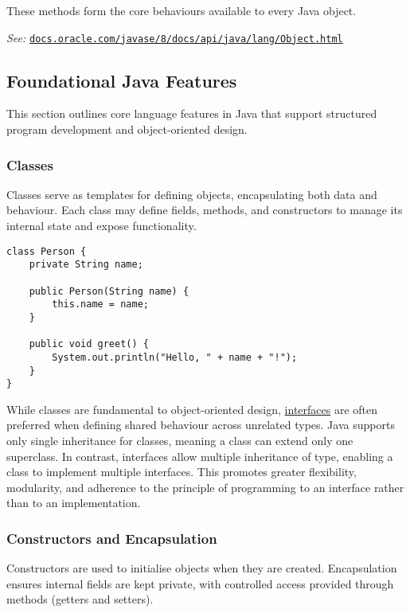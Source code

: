 \documentclass{article}
\begin{document}
These methods form the core behaviours available to every Java object.

\smallskip
\textit{See:} \href{https://docs.oracle.com/javase/8/docs/api/java/lang/Object.html}{\texttt{docs.oracle.com/javase/8/docs/api/java/lang/Object.html}}

\subsection{Foundational Java Features}

This section outlines core language features in Java that support structured program development and object-oriented design.

\subsubsection{Classes}

Classes serve as templates for defining objects, encapsulating both data and behaviour. Each class may define fields, methods, and constructors to manage its internal state and expose functionality.

\begin{verbatim}
class Person {
    private String name;

    public Person(String name) {
        this.name = name;
    }

    public void greet() {
        System.out.println("Hello, " + name + "!");
    }
}
\end{verbatim}

While classes are fundamental to object-oriented design, \hyperref[subsec:interfaces]{interfaces} are often preferred when defining shared behaviour across unrelated types. Java supports only single inheritance for classes, meaning a class can extend only one superclass. In contrast, interfaces allow multiple inheritance of type, enabling a class to implement multiple interfaces. This promotes greater flexibility, modularity, and adherence to the principle of programming to an interface rather than to an implementation.



\subsubsection{Constructors and Encapsulation}

Constructors are used to initialise objects when they are created. Encapsulation ensures internal fields are kept private, with controlled access provided through methods (getters and setters).
\end{document}
